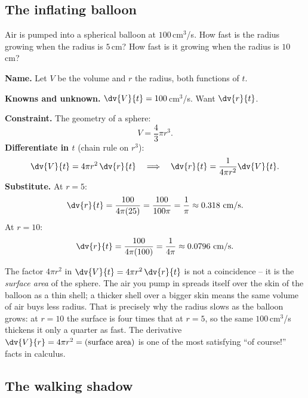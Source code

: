 \subsection{The inflating balloon}

\begin{example}
\label{ch13:ex-balloon}
Air is pumped into a spherical balloon at $100$\,cm$^3$/s. How fast is the radius growing when the
radius is $5$\,cm? How fast is it growing when the radius is $10$\,cm?

\textbf{Name.} Let $V$ be the volume and $r$ the radius, both functions of $t$.

\textbf{Knowns and unknown.} $\dv{V}{t} = 100$\,cm$^3$/s. Want $\dv{r}{t}$.

\textbf{Constraint.} The geometry of a sphere:
\[
V = \frac{4}{3}\pi r^3.
\]
\textbf{Differentiate in $t$} (chain rule on $r^3$):
\[
\dv{V}{t} = 4\pi r^2\,\dv{r}{t}
\quad\Longrightarrow\quad
\dv{r}{t} = \frac{1}{4\pi r^2}\dv{V}{t}.
\]
\textbf{Substitute.} At $r=5$:
\[
\dv{r}{t} = \frac{100}{4\pi(25)} = \frac{100}{100\pi} = \frac{1}{\pi}\approx 0.318\ \text{cm/s}.
\]
At $r=10$:
\[
\dv{r}{t} = \frac{100}{4\pi(100)} = \frac{1}{4\pi}\approx 0.0796\ \text{cm/s}.
\]
\end{example}

\begin{intuitionbox}
The factor $4\pi r^2$ in $\dv{V}{t} = 4\pi r^2\,\dv{r}{t}$ is not a coincidence -- it is the
\emph{surface area} of the sphere. The air you pump in spreads itself over the skin of the balloon as
a thin shell; a thicker shell over a bigger skin means the same volume of air buys less radius. That
is precisely why the radius slows as the balloon grows: at $r=10$ the surface is four times that at
$r=5$, so the same $100$\,cm$^3$/s thickens it only a quarter as fast. The derivative $\dv{V}{r} =
4\pi r^2 = (\text{surface area})$ is one of the most satisfying ``of course!'' facts in calculus.
\end{intuitionbox}

\subsection{The walking shadow}

